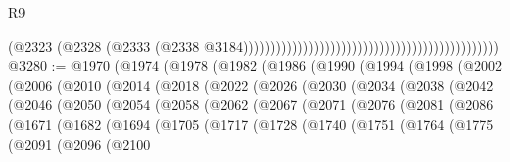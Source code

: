 \begin{lexlean}{R9}
\begin{coremodule}
                                                                                          (@2323
                                                                                            (@2328
                                                                                              (@2333
                                                                                                (@2338
                                                                                                  @3184)))))))))))))))))))))))))))))))))))))))))))))))
@3280 := @1970
    (@1974
      (@1978
        (@1982
          (@1986
            (@1990
              (@1994
                (@1998
                  (@2002
                    (@2006
                      (@2010
                        (@2014
                          (@2018
                            (@2022
                              (@2026
                                (@2030
                                  (@2034
                                    (@2038
                                      (@2042
                                        (@2046
                                          (@2050
                                            (@2054
                                              (@2058
                                                (@2062
                                                  (@2067
                                                    (@2071
                                                      (@2076
                                                        (@2081
                                                          (@2086
                                                            (@1671
                                                              (@1682
                                                                (@1694
                                                                  (@1705
                                                                    (@1717
                                                                      (@1728
                                                                        (@1740
                                                                          (@1751
                                                                            (@1764
                                                                              (@1775
                                                                                (@2091
                                                                                  (@2096
                                                                                    (@2100

\end{coremodule}
\end{lexlean}

